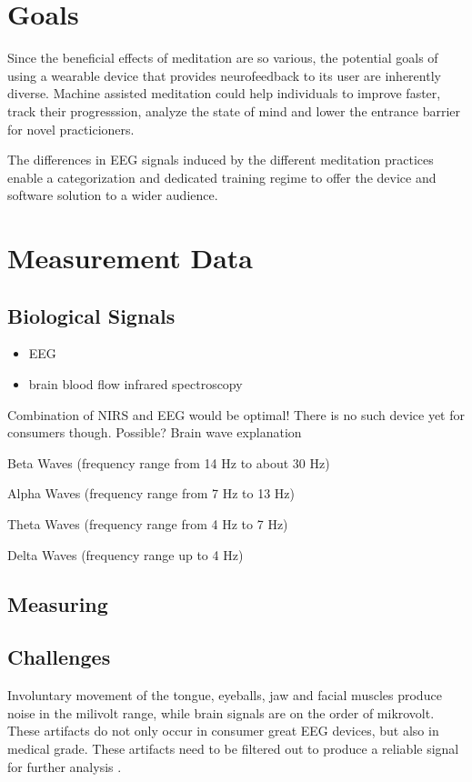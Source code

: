 \documentclass{llncs} %
\begin{document}
\section{Goals}
Since the beneficial effects of meditation are so various, the potential goals of using a wearable device 
that provides neurofeedback to its user are inherently diverse. Machine assisted meditation could help individuals to 
improve faster, track their progresssion, analyze the state of mind and lower the entrance barrier for novel practicioners. \cite{brand:del} \

The differences in EEG signals induced by the different meditation practices enable a categorization
and dedicated training regime to offer the device and software solution to a wider audience. \cite{Travis}
\section{Measurement Data}
\subsection{Biological Signals}
\begin{itemize}
    \item EEG
    \item brain blood flow infrared spectroscopy
\end{itemize}
Combination of NIRS and EEG would be optimal! There is no such device yet for consumers though.
Possible?
Brain wave explanation



Beta Waves (frequency range from 14 Hz to about 30 Hz)


Alpha Waves (frequency range from 7 Hz to 13 Hz)


Theta Waves (frequency range from 4 Hz to 7 Hz)


Delta Waves (frequency range up to 4 Hz)
\subsection{Measuring}
\subsection{Challenges}
Involuntary movement of the tongue, eyeballs, jaw and facial muscles produce noise in the milivolt range, while brain signals are on 
the order of mikrovolt. These artifacts do not only occur in consumer great EEG devices, but also in medical grade.
These artifacts need to be filtered out to produce a reliable signal for further analysis \cite{Bashivan: et al}.
\end{document}
